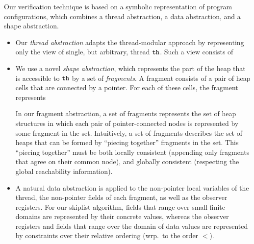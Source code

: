 Our verification technique is based on a symbolic representation of program
configurations, which combines a thread abstraction, a
data  abstraction, and a shape abstraction.
\begin{itemize}
  \item
Our {\em thread abstraction} adapts the thread-modular approach by representing only the view of single, but arbitrary, thread ${\tt th}$. Such a view consists of
\item
We use a novel {\em shape abstraction}, which represents the part of the heap
that is accessible to ${\tt th}$ by a set of {\em fragments}. 
A fragment consists of a pair of heap cells that are connected by a pointer.
For each of these cells, the fragment represents
In our fragment abstraction, a set of fragments represents the set of heap
structures in which each pair of pointer-connected nodes is represented by some
fragment in the set.
Intuitively, a set of fragments describes the set of heaps that can be formed by
``piecing together'' fragments in the set. This ``piecing together'' must
be both locally consistent (appending only fragments that agree on their
common node), and globally consistent (respecting the global reachability
information).
\item
A natural data abstraction is applied to the non-pointer local
variables of the thread, the non-pointer fields of each fragment, as well as
the observer registers. For our
skiplist algorithm, fields that range over small finite domains are represented
by their concrete values, whereas the observer registers and fields that range over the domain of data values
are represented by constraints over their relative ordering
(wrp.\ to the order $<$).
\end{itemize}
